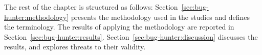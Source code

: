 


The rest of the chapter is structured as follows:
Section~\ref{sec:bug-hunter:methodology} presents the methodology used in the studies and defines the terminology. 
The results of applying the methodology are reported in Section~\ref{sec:bug-hunter:results}.
Section~\ref{sec:bug-hunter:discussion} discusses the results, and explores threats to their validity.



